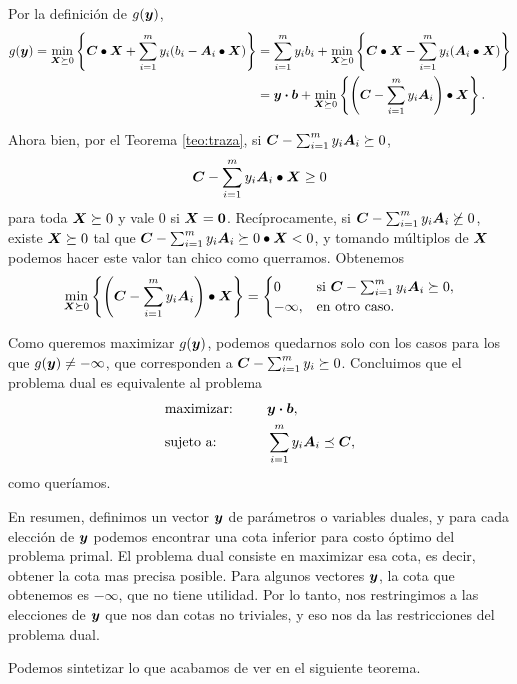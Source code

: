Por la definición de $g(\bm{y})$,
$$
\begin{aligned}
g(\bm{y}) = \min_{\bm{X} \succeq 0} \left\{ \bm{C} \bullet \bm{X} + \sum_{i=1}^m y_i (b_i - \bm{A}_i \bullet \bm{X})\right\}
&= \sum_{i=1}^m y_i b_i + \min_{\bm{X} \succeq 0} \left\{ \bm{C} \bullet \bm{X} - \sum_{i=1}^m y_i (\bm{A}_i \bullet \bm{X}) \right\} \\
&= \bm{y} \boldsymbol{\cdot} \bm{b} + \min_{\bm{X} \succeq 0} \left\{ \left(\bm{C} - \sum_{i=1}^m y_i \bm{A}_i\right) \bullet \bm{X} \right\}. \\
\end{aligned}
$$

Ahora bien, por el Teorema \ref{teo:traza}, si $\bm{C} - \sum_{i=1}^m y_i \bm{A}_i \succeq 0$, 
$$\bm{C} - \sum_{i=1}^m y_i \bm{A}_i \bullet \bm{X} \ge 0$$
para toda $\bm{X} \succeq 0$ y vale 0 si $\bm{X} = \bm{0}$. Recíprocamente, si $\bm{C} - \sum_{i=1}^m y_i \bm{A}_i \not\succeq 0$, existe $\bm{X} \succeq 0$ tal que $\bm{C} - \sum_{i=1}^m y_i \bm{A}_i \succeq 0 \bullet \bm{X} < 0$, y tomando múltiplos de $\bm{X}$ podemos hacer este valor tan chico como querramos. Obtenemos
$$\min_{\bm{X} \succeq 0} \left\{ \left(\bm{C} - \sum_{i=1}^m y_i \bm{A}_i\right) \bullet \bm{X} \right\} = \begin{cases}
0 & \text{si } \bm{C} - \sum_{i=1}^m y_i \bm{A}_i \succeq 0, \\
-\infty, & \text{en otro caso.}\end{cases}
$$

Como queremos maximizar $g(\bm{y})$, podemos quedarnos solo con los casos para los que $g(\bm{y}) \neq -\infty$, que corresponden a $\bm{C} - \sum_{i=1}^m y_i \succeq 0$. Concluimos que el problema dual es equivalente al problema
\begin{alignat*}{2}
  & \text{maximizar: }  & \quad & \bm{y} \boldsymbol{\cdot} \bm{b},   \\
   & \text{sujeto a: } & \quad & \sum_{i=1}^m y_i \bm{A}_i  \preceq \bm{C},
\end{alignat*}
como queríamos.

En resumen, definimos un vector $\bm{y}$ de parámetros o variables duales, y para cada elección de $\bm{y}$ podemos encontrar una cota inferior para costo óptimo del problema primal. El problema dual consiste en maximizar esa cota, es decir, obtener la cota mas precisa posible. Para algunos vectores $\bm{y}$, la cota que obtenemos es $-\infty$, que no tiene utilidad. Por lo tanto, nos restringimos a las elecciones de $\bm{y}$ que nos dan cotas no triviales, y eso nos da las restricciones del problema dual.

Podemos sintetizar lo que acabamos de ver en el siguiente teorema.

